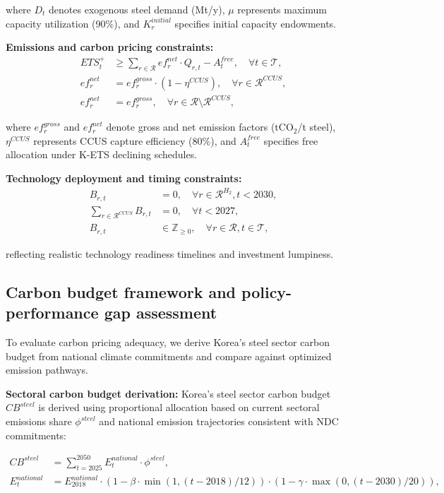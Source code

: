 \documentclass[preprint,1p,authoryear]{elsarticle}
\begin{document}
where $D_t$ denotes exogenous steel demand (Mt/y), $\mu$ represents maximum capacity utilization (90\%), and $K_r^{initial}$ specifies initial capacity endowments.

\textbf{Emissions and carbon pricing constraints:}
\begin{align}
ETS_t^+ &\ge \sum_{r \in \mathcal{R}} ef_r^{net} \cdot Q_{r,t} - A_t^{free}, \quad \forall t \in \mathcal{T}, \label{eq:ets_balance}\\
ef_r^{net} &= ef_r^{gross} \cdot (1 - \eta^{CCUS}), \quad \forall r \in \mathcal{R}^{CCUS}, \label{eq:ccus_factor}\\
ef_r^{net} &= ef_r^{gross}, \quad \forall r \in \mathcal{R} \setminus \mathcal{R}^{CCUS}, \label{eq:no_ccus}
\end{align}

where $ef_r^{gross}$ and $ef_r^{net}$ denote gross and net emission factors (tCO$_2$/t steel), $\eta^{CCUS}$ represents CCUS capture efficiency (80\%), and $A_t^{free}$ specifies free allocation under K-ETS declining schedules.

\textbf{Technology deployment and timing constraints:}
\begin{align}
B_{r,t} &= 0, \quad \forall r \in \mathcal{R}^{H_2}, t < 2030, \label{eq:h2_timing}\\
\sum_{r \in \mathcal{R}^{CCUS}} B_{r,t} &= 0, \quad \forall t < 2027, \label{eq:ccus_timing}\\
B_{r,t} &\in \mathbb{Z}_{\ge 0}, \quad \forall r \in \mathcal{R}, t \in \mathcal{T}, \label{eq:integer}
\end{align}

reflecting realistic technology readiness timelines and investment lumpiness.

\subsection{Carbon budget framework and policy-performance gap assessment}

To evaluate carbon pricing adequacy, we derive Korea's steel sector carbon budget from national climate commitments and compare against optimized emission pathways.

\textbf{Sectoral carbon budget derivation:}
Korea's steel sector carbon budget $CB^{steel}$ is derived using proportional allocation based on current sectoral emissions share $\phi^{steel}$ and national emission trajectories consistent with NDC commitments:

\begin{align}
CB^{steel} &= \sum_{t=2025}^{2050} E^{national}_t \cdot \phi^{steel}, \label{eq:budget_total}\\
E^{national}_t &= E^{national}_{2018} \cdot (1 - \beta \cdot \min(1, (t-2018)/12)) \cdot (1 - \gamma \cdot \max(0, (t-2030)/20)), \label{eq:national_trajectory}
\end{align}
\end{document}
